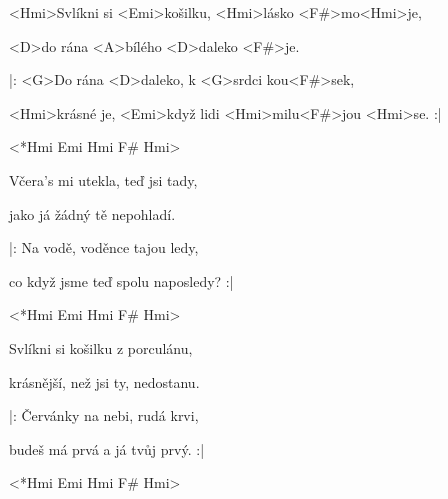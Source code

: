 

\zs
<Hmi>Svlíkni si <Emi>košilku, <Hmi>lásko <F#>mo<Hmi>je,

<D>do rána <A>bílého <D>daleko <F#>je.

|: <G>Do rána <D>daleko, k <G\dim>srdci kou<F#>sek,

<Hmi>krásné je, <Emi>když lidi <Hmi>milu<F#>jou <Hmi>se. :|
\ks

<*Hmi Emi Hmi F# Hmi>

\zs
Včera's mi utekla, teď jsi tady,

jako já žádný tě nepohladí.

|: Na vodě, voděnce tajou ledy,

co když jsme teď spolu naposledy? :|
\ks

<*Hmi Emi Hmi F# Hmi>

\zs
Svlíkni si košilku z porculánu,

krásnější, než jsi ty, nedostanu.

|: Červánky na nebi, rudá krvi,

budeš má prvá a já tvůj prvý. :|
\ks

<*Hmi Emi Hmi F# Hmi>

\kp
